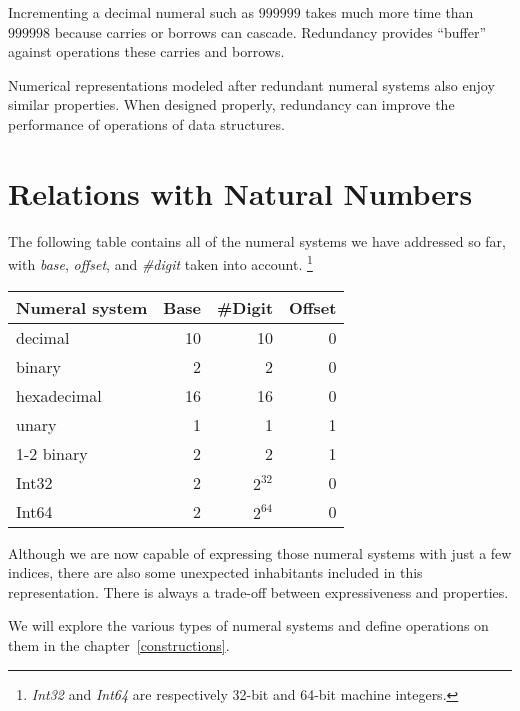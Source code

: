 \documentclass[\main/thesis.tex]{subfiles}
\begin{document}
Incrementing a decimal numeral such as $ 999999 $ takes much more time than
$ 999998 $ because carries or borrows can cascade.
Redundancy provides ``buffer'' against operations these carries and borrows.

Numerical representations modeled after redundant numeral systems also enjoy
similar properties. When designed properly, redundancy can improve the performance
of operations of data structures.

\section{Relations with Natural Numbers}

The following table contains all of the numeral systems we have addressed so far,
with \textit{base}, \textit{offset}, and \textit{\#digit} taken into account.
\footnote{
\textit{Int32} and \textit{Int64} are respectively 32-bit and 64-bit machine
integers.
}

\begin{center}
    \begin{adjustbox}{max width=\textwidth}
    \begin{tabular}{ | l | r | r | r | }
    \textbf{Numeral system} & \textbf{Base} & \textbf{\#Digit} & \textbf{Offset} \\
    \hline
    decimal         & 10 & 10 & 0 \\
    binary          & 2  & 2  & 0 \\
    hexadecimal     & 16 & 16 & 0 \\
    unary           & 1  & 1  & 1 \\
    1-2 binary      & 2  & 2  & 1 \\
    Int32           & 2  & $ 2^{32} $ & 0 \\
    Int64           & 2  & $ 2^{64} $ & 0 \\
    \end{tabular}
    \end{adjustbox}
\end{center}

Although we are now capable of expressing those numeral systems with just a few
indices, there are also some unexpected inhabitants included in this representation.
There is always a trade-off between expressiveness and properties.

We will explore the various types of numeral systems and define operations on
them in the chapter~\ref{constructions}.

%
%
%
\end{document}
